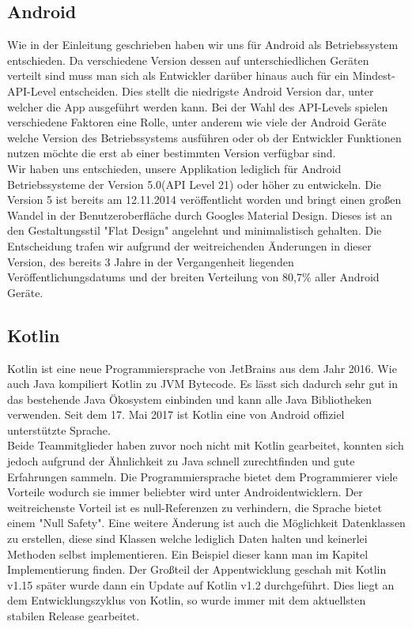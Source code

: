 \subsection{Android}
Wie in der Einleitung geschrieben haben wir uns für Android als Betriebssystem entschieden. Da verschiedene Version dessen auf unterschiedlichen Geräten verteilt sind
muss man sich als Entwickler darüber hinaus auch für ein Mindest-API-Level entscheiden. Dies stellt die niedrigste Android Version dar, unter welcher die App ausgeführt werden kann.
Bei der Wahl des API-Levels spielen verschiedene Faktoren eine Rolle, unter anderem wie viele der Android Geräte welche Version des Betriebssystems ausführen oder ob der Entwickler
Funktionen nutzen möchte die erst ab einer bestimmten Version verfügbar sind.\\
Wir haben uns entschieden, unsere Applikation lediglich für Android Betriebssysteme der Version 5.0(API Level 21) oder höher zu entwickeln.
Die Version 5 ist bereits am 12.11.2014 veröffentlicht worden und bringt einen großen Wandel in der Benutzeroberfläche durch Googles Material Design.
Dieses ist an den Gestaltungsstil "Flat Design" angelehnt und minimalistisch gehalten. Die Entscheidung trafen wir aufgrund der weitreichenden 
Änderungen in dieser Version, des bereits 3 Jahre in der Vergangenheit liegenden Veröffentlichungsdatums und der breiten Verteilung von 80,7\% aller Android Geräte.

\subsection{Kotlin}

Kotlin ist eine neue Programmiersprache von JetBrains aus dem Jahr 2016. Wie auch Java kompiliert Kotlin zu JVM Bytecode. Es lässt sich dadurch sehr gut in das bestehende Java Ökosystem einbinden und kann alle Java Bibliotheken verwenden. Seit dem 17. Mai 2017 ist Kotlin eine von Android offiziel unterstützte Sprache.\\
Beide Teammitglieder haben zuvor noch nicht mit Kotlin gearbeitet, konnten sich jedoch aufgrund der Ähnlichkeit zu Java schnell zurechtfinden und gute Erfahrungen sammeln. Die Programmiersprache bietet dem Programmierer viele Vorteile wodurch sie immer beliebter wird unter Androidentwicklern. Der weitreichenste Vorteil ist es  null-Referenzen zu verhindern, die Sprache bietet einem "Null Safety". Eine weitere Änderung ist auch die Möglichkeit Datenklassen zu erstellen, diese sind Klassen welche lediglich Daten halten und keinerlei Methoden selbst implementieren. Ein Beispiel dieser kann man im Kapitel Implementierung finden. Der Großteil der Appentwicklung geschah mit Kotlin v1.15 später wurde dann ein Update auf Kotlin v1.2 durchgeführt. Dies liegt an dem Entwicklungszyklus von Kotlin, so wurde immer mit dem aktuellsten stabilen Release gearbeitet.

